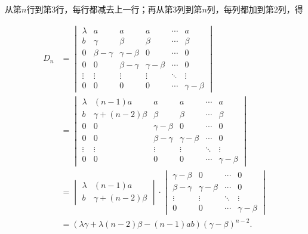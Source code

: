 \begin{solution}
    从第$n$行到第3行，每行都减去上一行；再从第3列到第$n$列，每列都加到第2列，得

    \begin{align*}
        D_n & =
        \begin{vmatrix}
            \lambda & a            & a            & a            & \cdots & a            \\
            b       & \gamma       & \beta        & \beta        & \cdots & \beta        \\
            0       & \beta-\gamma & \gamma-\beta & 0            & \cdots & 0            \\
            0       & 0            & \beta-\gamma & \gamma-\beta & \cdots & 0            \\
            \vdots  & \vdots       & \vdots       & \vdots       & \ddots & \vdots       \\
            0       & 0            & 0            & 0            & \cdots & \gamma-\beta
        \end{vmatrix}             \\
            & =\begin{vmatrix}
                   \lambda & (n-1)a            & a            & a            & \cdots & a            \\
                   b       & \gamma+(n-2)\beta & \beta        & \beta        & \cdots & \beta        \\
                   0       & 0                 & \gamma-\beta & 0            & \cdots & 0            \\
                   0       & 0                 & \beta-\gamma & \gamma-\beta & \cdots & 0            \\
                   \vdots  & \vdots            & \vdots       & \vdots       & \ddots & \vdots       \\
                   0       & 0                 & 0            & 0            & \cdots & \gamma-\beta
               \end{vmatrix} \\
            & =\begin{vmatrix}
                   \lambda & (n-1)a            \\
                   b       & \gamma+(n-2)\beta
               \end{vmatrix} \cdot \begin{vmatrix}
                                       \gamma-\beta & 0            & \cdots & 0            \\
                                       \beta-\gamma & \gamma-\beta & \cdots & 0            \\
                                       \vdots       & \vdots       & \ddots & \vdots       \\
                                       0            & 0            & \cdots & \gamma-\beta
                                   \end{vmatrix}           \\
            & =(\lambda \gamma+\lambda(n-2)\beta-(n-1)ab)(\gamma-\beta)^{n-2}.
    \end{align*}
\end{solution}

